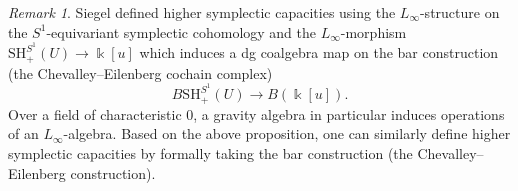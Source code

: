 \documentclass[11pt]{amsart}
\numberwithin{equation}{section}
\theoremstyle{plain}
\theoremstyle{definition}
\theoremstyle{remark}
\newtheorem{RMK}[rmk]{Remark}
\begin{document}
\begin{RMK}
Siegel \cite{SiegelHigherCapacities} defined higher symplectic capacities using the $L_\infty$-structure on the $S^1$-equivariant symplectic cohomology and the $L_\infty$-morphism $\mathrm{SH}_+^{S^1}(U) \to \Bbbk[u]$ which induces a dg coalgebra map on the bar construction (the Chevalley--Eilenberg cochain complex)
\[B\mathrm{SH}_+^{S^1}(U) \to B(\Bbbk[u]).\]
Over a field of characteristic $0$, a gravity algebra in particular induces operations of an $L_\infty$-algebra. Based on the above proposition, one can similarly define higher symplectic capacities by formally taking the bar construction (the Chevalley--Eilenberg construction).
\end{RMK}



\clearpage
{}

\end{document}
